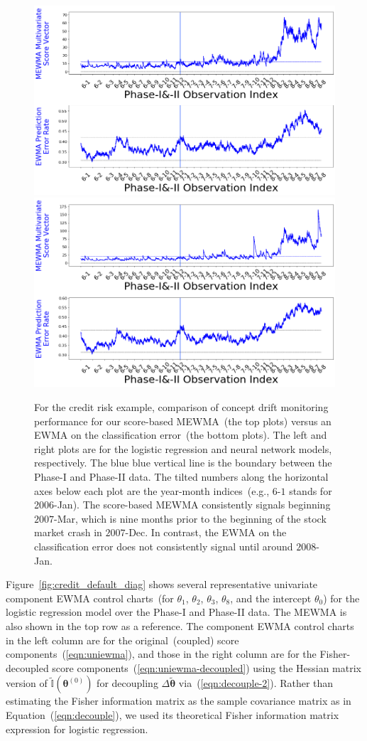 \documentclass[twoside,11pt]{article}
\begin{document}
\begin{figure}[!htbp]
\centering
\includegraphics[width = 0.49\linewidth]{../figures/v14/credit_default/logi_scal_PI_train_sample_weights/credit_logi_1e-08_0_0001_0_001_99_0.png}
\includegraphics[width = 0.49\linewidth]{../figures/v14/credit_default/logi_nnet_50_scal_PI_train_sample_weights/credit_logi_1e-07_0_0001_0_001_99_0.png}
  \caption{
For the credit risk example, comparison of concept drift monitoring performance for our score-based MEWMA~(the top plots) versus an EWMA on the classification error~(the bottom plots). The left and right plots are for the logistic regression and neural network models, respectively. The blue blue vertical line is the boundary between the Phase-I and Phase-II data. The tilted numbers along the horizontal axes below each plot are the year-month indices~(e.g., $6$-$1$ stands for 2006-Jan). The score-based MEWMA consistently signals beginning $2007$-Mar, which is nine months prior to the beginning of the stock market crash in $2007$-Dec. In contrast, the EWMA on the classification error does not consistently signal until around $2008$-Jan. 
}
\label{fig:credit_default}
\end{figure}

Figure~\ref{fig:credit_default_diag} shows several representative univariate component EWMA control charts~(for $\theta_1$, $\theta_2$, $\theta_3$, $\theta_8$, and the intercept $\theta_0$) for the logistic regression model over the Phase-I and Phase-II data. The MEWMA is also shown in the top row as a reference. The component EWMA control charts in the left column are for the original~(coupled) score components~(\ref{eqn:uniewma}), and those in the right column are for the Fisher-decoupled score components~(\ref{eqn:uniewma-decoupled}) using the Hessian matrix version of $\widetilde{\mathbb {I}}(\bm { \theta}^{ (0)})$ for decoupling $\Delta \tilde{\bm { \theta}}$ via~(\ref{eqn:decouple-2}). Rather than estimating the Fisher information matrix as the sample covariance matrix as in Equation~(\ref{eqn:decouple}), we used its theoretical Fisher information matrix expression for logistic regression.
\end{document}
